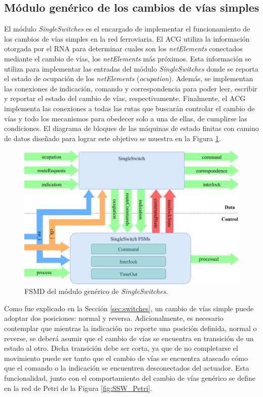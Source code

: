 \subsection{Módulo genérico de los cambios de vías simples}

El módulo \textit{SingleSwitches} es el encargado de implementar el funcionamiento de los cambios de vías simples en la red ferroviaria. El ACG utiliza la información otorgada por el RNA para determinar cuales son los \textit{netElements} conectados mediante el cambio de vías, los \textit{netElements} más próximos. Esta información se utiliza para implementar las entradas del módulo \textit{SingleSwitches} donde se reporta el estado de ocupación de los \textit{netElements} (\textit{ocupation}). Además, se implementan las conexiones de indicación, comando y correspondencia para poder leer, escribir y reportar el estado del cambio de vías, respectivamente. Finalmente, el ACG implementa las conexiones a todas las rutas que buscarán controlar el cambio de vías y todo los mecanismos para obedecer solo a una de ellas, de cumplirse las condiciones. El diagrama de bloques de las máquinas de estado finitas con camino de datos diseñado para lograr este objetivo se muestra en la Figura \ref{fig:SSW_module}.

\begin{figure}[H]
	\centering
	\includegraphics[width=1\textwidth]{Figuras/SSW_module}
	\centering\caption{FSMD del módulo genérico de \textit{SingleSwitches}.}
	\label{fig:SSW_module}
\end{figure}

Como fue explicado en la Sección \ref{sec:switches}, un cambio de vías simple puede adoptar dos posiciones: normal y reversa. Adicionalmente, es necesario contemplar que mientras la indicación no reporte una posición definida, normal o reverse, se deberá asumir que el cambio de vías se encuentra en transición de un estado al otro. Dicha transición debe ser corta, ya que de no completarse el movimiento puede ser tanto que el cambio de vías se encuentra atascado cómo que el comando o la indicación se encuentren desconectados del actuador. Esta funcionalidad, junto con el comportamiento del cambio de vías genérico se define en la red de Petri de la Figura \ref{fig:SSW_Petri}.

